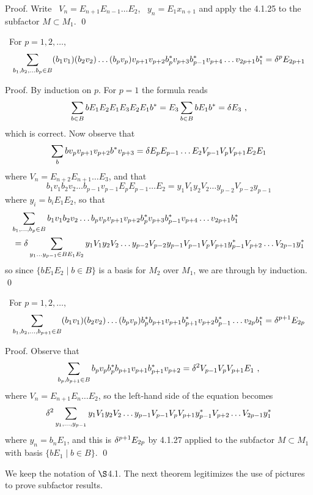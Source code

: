 \bs
{\sc Proof.} Write \ $V_n=E_{n+1}E_{n-1}\dots E_2$, \
$y_n=E_1x_{n+1}$ and apply the 4.1.25 to the subfactor $M\subset
M_1$. \qed

\bs
{} \ For
$p=1,2,\dots,$
\[
\sum_{b_1,b_2,\dots b_p\in B} (b_1v_1)(b_2v_2)\dots
(b_pv_p)v_{p+1}v_{p+2} b^*_{p}v_{p+3}b^*_{p-1} v_{p+4}\dots
v_{2p+1}b^*_1 = \delta^p E_{2p+1}
\]

\bs
{\sc Proof.}
By induction on $p$. For $p=1$ the formula reads
$$
\sum_{b\in B} bE_1E_2E_1E_3E_2E_1b^* = E_3 \sum_{b\in B}
bE_1b^* = \delta E_3  \ ,
$$
which is correct. Now observe that
$$
\sum_b bv_p v_{p+1}v_{p+2}b^*v_{p+3}=\delta
E_p E_{p-1}\dots E_2 V_{p-1}V_p V_{p+1} E_2E_1
$$
where $V_n=E_{n+2}E_{n+1}\dots E_3$, and that
$$
b_1v_1b_2v_2\dots b_{p-1}v_{p-1}E_pE_{p-1}\dots E_2=
y_1V_1y_2V_2\dots y_{p-2}V_{p-2}y_{p-1}
$$
where $y_i=b_iE_1E_2$, so that
\begin{eqnarray*}
&\displaystyle{\sum_{b_1,\dots ,b_p\in B} b_1v_1b_2v_2\dots b_pv_p v_{p+1}v_{p+2}b^*_p v_{p+3}b^*_{p-1} v_{p+4}\dots v_{2p+1}b^*_1} \\
& = \displaystyle{\delta\sum_{y_1\dots y_{p-1}\in BE_1E_2} y_1V_1y_2V_2\dots y_{p-2}V_{p-2}y_{p-1}V_{p-1}V_pV_{p+1} y^*_{p-1}V_{p+2}\dots V_{2p-1}y^*_1}
\end{eqnarray*}
so since $\{ bE_1E_2\mid b\in B\}$ is a basis for $M_2$ over $M_1$,
we are through by induction. \qed

 \ For
$p=1,2,\dots,$
$$
\sum_{b_1,b_2,\dots ,b_{p+1}\in B}
(b_1v_1)(b_2v_2)\dots (b_pv_p)b^*_p b_{p+1}v_{p+1}
b^*_{p+1}v_{p+2} b^*_{p-1}\dots v_{2p}b^*_1 =\delta^{p+1}E_{2p}
$$

\bigskip
{\sc Proof.} Observe that
$$
\sum_{b_p,b_{p+1}\in B} b_pv_p b^*_pb_{p+1} v_{p+1}
b^*_{p+1}v_{p+2} = \delta^2 V_{p-1}V_p V_{p+1}E_1 \ ,
$$
where $V_n=E_{n+1}E_n\dots E_2$, so the left-hand side of the
equation becomes
$$
\delta^2\sum_{y_1,\dots ,y_{p-1}} y_1V_1y_2V_2\dots y_{p-1}
V_{p-1} V_pV_{p+1} y^*_{p-1}V_{p+2}\dots V_{2p-1}y^*_1
$$
where $y_n=b_nE_1$, and this is $\delta^{p+1}E_{2p}$ by 4.1.27 applied
to the subfactor $M\subset M_1$ with basis $\{bE_1\mid b\in B\}$.
\qed

\bs\bs{}

\smallskip We keep the notation of $\S$4.1.
The next theorem legitimizes the use of pictures to prove
subfactor results.

